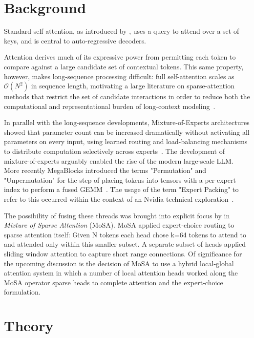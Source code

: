 \documentclass[11pt]{article}
\begin{document}
\section{Background}
\label{sec:background}

Standard self-attention, as introduced by \citet{vaswani2017attention}, uses a query to attend over a set of keys, and is central to auto-regressive decoders.

Attention derives much of its expressive power from permitting each token to compare against a large candidate set of contextual tokens. This same property, however, makes long-sequence processing difficult: full self-attention scales as $\mathcal{O}(N^2)$ in sequence length, motivating a large literature on sparse-attention methods that restrict the set of candidate interactions in order to reduce both the computational and representational burden of long-context modeling~\citep{kitaev2020reformer,roy2021routing,liu2024lost}.

In parallel with the long-sequence developments, Mixture-of-Experts architectures showed that parameter count can be increased dramatically without activating all parameters on every input, using learned routing and load-balancing mechanisms to distribute computation selectively across experts~\citep{shazeer2017outrageously,fedus2022switch}. The development of mixture-of-experts arguably enabled the rise of the modern large-scale LLM. More recently MegaBlocks introduced the terms "Permutation" and "Unpermutation" for the step of placing tokens into tensors with a per-expert index to perform a fused GEMM~\citep{gale2023megablocks}. The usage of the term "Expert Packing" to refer to this occurred within the context of an Nvidia technical exploration~\citep{alvarez2025wideepnvl72}.

The possibility of fusing these threads was brought into explicit focus by \citet{piekos2025mosa} in \emph{Mixture of Sparse Attention} (MoSA). MoSA applied expert-choice routing to sparse attention itself: Given N tokens each head chose k=64 tokens to attend to and attended only within this smaller subset. A separate subset of heads applied sliding window attention to capture short range connections. Of significance for the upcoming discussion is the decision of MoSA to use a hybrid local-global attention system in which a number of local attention heads worked along the MoSA operator sparse heads to complete attention and the expert-choice formulation.

\section{Theory}
\label{sec:theory}
\end{document}
